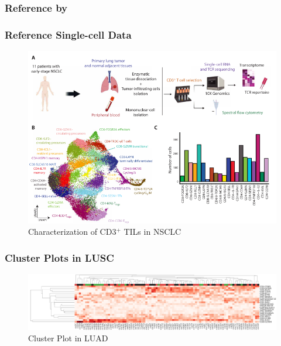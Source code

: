 \documentclass{beamer}
\begin{document}
    \subsubsection{Reference by \protect{}}
    \begin{frame}
        \frametitle{Reference Single-cell Data}

        \begin{figure}
            \includegraphics[width=0.8 \linewidth]{figures/LungCancer/reference_2.png}
            \caption{Characterization of CD3$^+$ TILs in NSCLC \protect\cite{singlecell2}}
        \end{figure}
    \end{frame}

    \begin{frame}
        \frametitle{Cluster Plots in LUSC}

        \begin{figure}
            \includegraphics[width=\linewidth]{figures/BisqueRNA/clustermap/STAR.SQC.GSE162498.cluster.pdf}
            \caption{Cluster Plot in LUAD}
        \end{figure}
    \end{frame}
\end{document}
